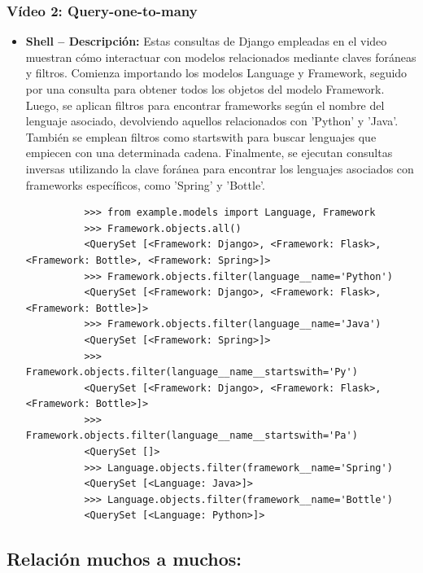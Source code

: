 \documentclass{article}
\begin{document}
  \subsubsection{Vídeo 2: Query-one-to-many}
    \begin{itemize}
      \item \textbf{Shell -- Descripción: }Estas consultas de Django empleadas en el video muestran cómo interactuar 
        con modelos relacionados mediante claves foráneas y filtros. Comienza importando los modelos Language y Framework, 
        seguido por una consulta para obtener todos los objetos del modelo Framework. Luego, se aplican filtros para 
        encontrar frameworks según el nombre del lenguaje asociado, devolviendo aquellos relacionados con 'Python' y 'Java'. 
        También se emplean filtros como startswith para buscar lenguajes que empiecen con una determinada cadena. Finalmente, 
        se ejecutan consultas inversas utilizando la clave foránea para encontrar los lenguajes asociados con frameworks 
        específicos, como 'Spring' y 'Bottle'.
        \begin{lstlisting}
          >>> from example.models import Language, Framework
          >>> Framework.objects.all()
          <QuerySet [<Framework: Django>, <Framework: Flask>, <Framework: Bottle>, <Framework: Spring>]>
          >>> Framework.objects.filter(language__name='Python')
          <QuerySet [<Framework: Django>, <Framework: Flask>, <Framework: Bottle>]>
          >>> Framework.objects.filter(language__name='Java')
          <QuerySet [<Framework: Spring>]>
          >>> Framework.objects.filter(language__name__startswith='Py')
          <QuerySet [<Framework: Django>, <Framework: Flask>, <Framework: Bottle>]>
          >>> Framework.objects.filter(language__name__startswith='Pa')
          <QuerySet []>
          >>> Language.objects.filter(framework__name='Spring')
          <QuerySet [<Language: Java>]>
          >>> Language.objects.filter(framework__name='Bottle')
          <QuerySet [<Language: Python>]>
        \end{lstlisting}
    \end{itemize}
  

  \subsection{Relación muchos a muchos: }
   
\end{document}
